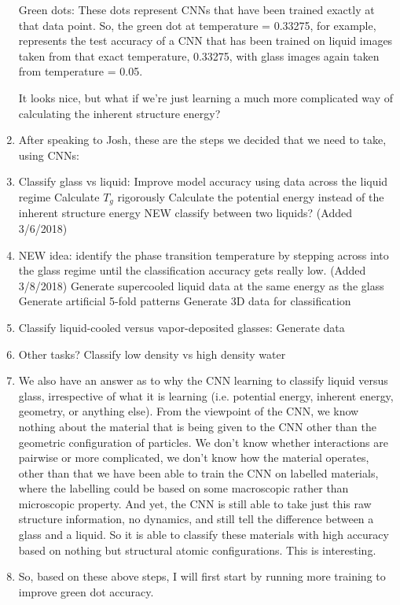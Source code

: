 \documentclass[12pt,reqno]{amsart}
\numberwithin{equation}{section}
\begin{document}
\begin{enumerate}
Green dots:
These dots represent CNNs that have been trained exactly at that data point.  So, the green dot at temperature = 0.33275, for example, represents the test accuracy of a CNN that has been trained on liquid images taken from that exact temperature, 0.33275, with glass images again taken from temperature = 0.05.  

It looks nice, but what if we're just learning a much more complicated way of calculating the inherent structure energy?

\item After speaking to Josh, these are the steps we decided that we need to take, using CNNs:

\item Classify glass vs liquid:
\subitem Improve model accuracy using data across the liquid regime
\subitem Calculate $T_g$ rigorously
\subitem Calculate the potential energy instead of the inherent structure energy
\subitem NEW classify between two liquids? (Added 3/6/2018)
\item NEW idea: identify the phase transition temperature by stepping across into the glass regime until the classification accuracy gets really low. (Added 3/8/2018)  
\subitem Generate supercooled liquid data at the same energy as the glass
\subitem Generate artificial 5-fold patterns
\subitem Generate 3D data for classification
\item Classify liquid-cooled versus vapor-deposited glasses:
\subitem Generate data
\item Other tasks?
\subitem Classify low density vs high density water

\item We also have an answer as to why the CNN learning to classify liquid versus glass, irrespective of what it is learning (i.e. potential energy, inherent energy, geometry, or anything else).  From the viewpoint of the CNN, we know nothing about the material that is being given to the CNN other than the geometric configuration of particles.  We don't know whether interactions are pairwise or more complicated, we don't know how the material operates, other than that we have been able to train the CNN on labelled materials, where the labelling could be based on some macroscopic rather than microscopic property.  And yet, the CNN is still able to take just this raw structure information, no dynamics, and still tell the difference between a glass and a liquid.  So it is able to classify these materials with high accuracy based on nothing but structural atomic configurations.  This is interesting.  

\item So, based on these above steps, I will first start by running more training to improve green dot accuracy.  


\end{enumerate}
\end{document}
